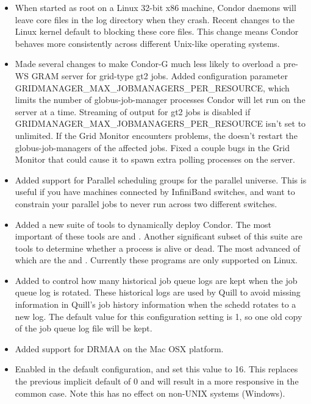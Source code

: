\begin{itemize}
\item When started as root on a Linux 32-bit x86 machine, Condor daemons will
leave core files in the log directory when they crash.  Recent changes to the
Linux kernel default to blocking these core files.  This change means
Condor behaves more consistently across different Unix-like operating systems.

\item Made several changes to make Condor-G much less likely to overload a
pre-WS GRAM server for grid-type gt2 jobs. Added configuration parameter
GRIDMANAGER\_MAX\_JOBMANAGERS\_PER\_RESOURCE, which limits the number of
globus-job-manager processes Condor will let run on the server at a time.
Streaming of output for gt2 jobs is disabled if
GRIDMANAGER\_MAX\_JOBMANAGERS\_PER\_RESOURCE isn't set to unlimited.
If the Grid Monitor encounters problems, the  doesn't
restart the globus-job-managers of the affected jobs. Fixed a couple bugs
in the Grid Monitor that could cause it to spawn extra polling processes
on the server.

\item Added support for Parallel scheduling groups for the parallel
universe.  This is useful if you have machines connected by InfiniBand
switches, and want to constrain your parallel jobs to never run across
two different switches.

\item Added a new suite of tools to dynamically deploy Condor.  The
most important of these tools are  and
. Another significant subset of this suite are
tools to determine whether a process is alive or dead.  The most
advanced of which are the  and
.  Currently these programs are only
supported on Linux.

\item Added  to control how
many historical job queue logs are kept when the job queue log is
rotated.  These historical logs are used by Quill to avoid missing
information in Quill's job history information when the schedd rotates
to a new log.  The default value for this configuration setting is 1,
so one old copy of the job queue log file will be kept.

\item Added support for DRMAA on the Mac OSX platform.

\item Enabled  in the default
 configuration, and set this value to 16.  This
replaces the previous implicit default of 0 and will result in a more responsive  in the common case.
Note this
 has no effect on non-UNIX systems (Windows).


\end{itemize}
